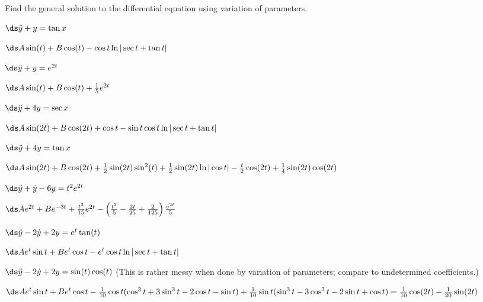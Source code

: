 \begin{exercises}

Find the general solution to the differential equation using variation
of parameters.

\begin{exercise} $\ds\ddot y+y=\tan x$
\begin{answer} $\ds A\sin(t)+B\cos(t)-\hfill\break\cos t\ln|\sec t+\tan t|$
\end{answer}\end{exercise}

\begin{exercise} $\ds\ddot y+y=e^{2t}$
\begin{answer} $\ds A\sin(t)+B\cos(t)+{1\over5}e^{2t}$
\end{answer}\end{exercise}

\begin{exercise} $\ds\ddot y+4y=\sec x$
\begin{answer} $\ds A\sin(2t)+B\cos(2t)+\cos t-\sin t\cos t\ln|\sec t+\tan t|$
\end{answer}\end{exercise}

\begin{exercise} $\ds\ddot y+4y=\tan x$
\begin{answer} $\ds A\sin(2t)+B\cos(2t)+{1\over2}\sin(2t)\sin^2(t)+
{1\over2}\sin(2t)\ln|\cos t|-{t\over2}\cos(2t)+{1\over4}\sin(2t)\cos(2t)$
\end{answer}\end{exercise}

\begin{exercise} $\ds\ddot y+\dot y-6y=t^2e^{2t}$
\begin{answer} $\ds Ae^{2t}+Be^{-3t}+{t^3\over15}e^{2t}-\left({t^2\over5}
-{2t\over25}+{2\over125}\right){e^{2t}\over5}$
\end{answer}\end{exercise}

\begin{exercise} $\ds\ddot y-2\dot y+2y=e^{t}\tan(t)$
\begin{answer} $\ds Ae^{t}\sin t+Be^{t}\cos t-e^t\cos t\ln|\sec t+\tan t|$
\end{answer}\end{exercise}

\begin{exercise} $\ds\ddot y-2\dot y+2y=\sin(t)\cos(t)$ (This is rather messy
when done by variation of parameters; compare to undetermined coefficients.)
\begin{answer} $\ds Ae^{t}\sin t+Be^{t}\cos t-
{1\over10}\cos t(\cos^3 t+3\sin^3 t-2\cos t-\sin t)+
{1\over10}\sin t(\sin^3 t-3\cos^3 t-2\sin t+\cos t)=
{1\over10}\cos(2t)-{1\over20}\sin(2t)$
\end{answer}\end{exercise}

\end{exercises}
